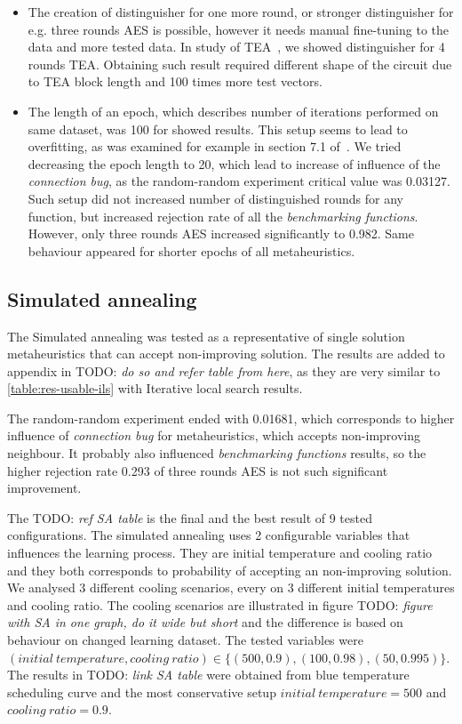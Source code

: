 \documentclass[
  print, %
  Table,   %
  nolof,     %
  nolot,     %
  11pt, %
  oneside  %
]{fithesis3}
\newcommand{\todo}[1]{TODO: \textit{#1}}
\begin{document}
\begin{itemize}
    \item The creation of distinguisher for one more round, or stronger distinguisher for e.g. three rounds AES is possible, however it needs manual fine-tuning to the data and more tested data. In study of TEA~\cite{kubicek2016new}, we showed distinguisher for 4 rounds TEA. Obtaining such result required different shape of the circuit due to TEA block length and 100 times more test vectors.
    \item The length of an epoch, which describes number of iterations performed on same dataset, was 100 for showed results. This setup seems to lead to overfitting, as was examined for example in section 7.1 of~\cite{ukropBcThesis}. We tried decreasing the epoch length to 20, which lead to increase of influence of the \textit{connection bug}, as the random-random experiment critical value was 0.03127. Such setup did not increased number of distinguished rounds for any function, but increased rejection rate of all the \textit{benchmarking functions}. However, only three rounds AES increased significantly to 0.982. Same behaviour appeared for shorter epochs of all metaheuristics.
\end{itemize}


\subsection{Simulated annealing}
\label{subsec:res-ss-sa}

The Simulated annealing was tested as a representative of single solution metaheuristics that can accept non-improving solution. The results are added to appendix in \todo{do so and refer table from here}, as they are very similar to \cref{table:res-usable-ils} with Iterative local search results.

The random-random experiment ended with 0.01681, which corresponds to higher influence of \textit{connection bug} for metaheuristics, which accepts non-improving neighbour. It probably also influenced \textit{benchmarking functions} results, so the higher rejection rate 0.293 of three rounds AES is not such significant improvement.

The \todo{ref SA table} is the final and the best result of 9 tested configurations. The simulated annealing uses 2 configurable variables that influences the learning process. They are initial temperature and cooling ratio and they both corresponds to probability of accepting an non-improving solution. We analysed 3 different cooling scenarios, every on 3 different initial temperatures and cooling ratio. The cooling scenarios are illustrated in figure \todo{figure with SA in one graph, do it wide but short} and the difference is based on behaviour on changed learning dataset. The tested variables were $(\mathit{initial~temperature, cooling~ratio}) \in \{ (500, 0.9), (100, 0.98), (50, 0.995) \}$. The results in \todo{link SA table} were obtained from blue temperature scheduling curve and the most conservative setup $\mathit{initial~temperature} = 500$ and $\mathit{cooling~ratio} = 0.9$.
\end{document}
